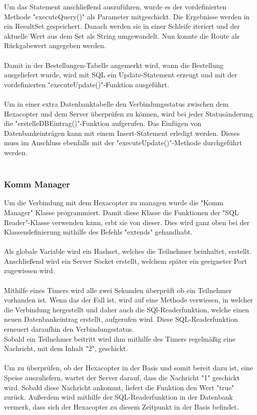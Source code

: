 Um das Statement anschließend auszuführen, wurde es der vordefinierten Methode "executeQuery()" als Parameter mitgeschickt.
Die Ergebnisse werden in ein ResultSet gespeichert. Danach werden sie in einer Schleife iteriert und der aktuelle Wert aus dem Set als String umgewandelt. Nun konnte die Route als Rückgabewert angegeben werden.
\\ \\
Damit in der Bestellungen-Tabelle angemerkt wird, wann die Bestellung ausgeliefert wurde, wird mit SQL ein Update-Statement erzeugt und mit der vordefinierten "executeUpdate()"-Funktion ausgeführt.
\\ \\
Um in einer extra Datenbanktabelle den Verbindungsstatus zwischen dem Hexacopter und dem Server überprüfen zu können, wird bei jeder Statusänderung die "erstelleDBEintrag()"-Funktion aufgerufen. Das Einfügen von Datenbankeinträgen kann mit einem Insert-Statement erledigt werden. Dieses muss im Anschluss ebenfalls mit der "executeUpdate()"-Methode durchgeführt werden.
\\ \\
\subsubsection*{Komm Manager}
Um die Verbindung mit dem Hexacopter zu managen wurde die "Komm Manager" Klasse programmiert.
Damit diese Klasse die Funktionen der "SQL Reader"-Klasse verwenden kann, erbt sie von dieser. Dies wird ganz oben bei der Klassendefinierung mithilfe des Befehls "extends" gehandhabt.
\\ \\
Als globale Variable wird ein Hashset, welches die Teilnehmer beinhaltet, erstellt.
Anschließend wird ein Server Socket erstellt, welchem später ein geeigneter Port zugewiesen wird.
\\ \\
Mithilfe eines Timers wird alle zwei Sekunden überprüft ob ein Teilnehmer vorhanden ist. Wenn das der Fall ist, wird auf eine Methode verwiesen, in welcher die Verbindung hergestellt und daher auch die SQl-Readerfunktion, welche einen neuen Datenbankeintrag erstellt, aufgerufen wird. Diese SQL-Readerfunktion erneuert daraufhin den Verbindungsstatus.
\\
Sobald ein Teilnehmer beitritt wird ihm mithilfe des Timers regelmäßig eine Nachricht, mit dem Inhalt "2", geschickt.
\\ \\
Um zu überprüfen, ob der Hexacopter in der Basis und somit bereit dazu ist, eine Speise auszuliefern, wartet der Server darauf, dass die Nachricht "1" geschickt wird. Sobald diese Nachricht ankommt, liefert die Funktion den Wert "true" zurück. Außerdem wird mithilfe der SQL-Readerfunktion in der Datenbank vermerk, dass sich der Hexacopter zu diesem Zeitpunkt in der Basis befindet.
\\ \\
